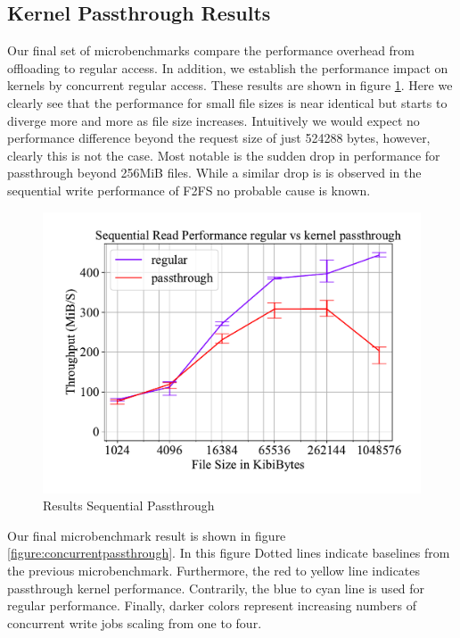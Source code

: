 \subsection{Kernel Passthrough Results}

Our final set of microbenchmarks compare the performance overhead from
offloading to regular access. In addition, we establish the performance impact
on kernels by concurrent regular access. These results are shown in figure
\ref{figure:passthroughresults}. Here we clearly see that the performance
for small file sizes is near identical but starts to diverge more and more
as file size increases. Intuitively we would expect no performance difference
beyond the request size of just 524288 bytes, however, clearly this is not the
case. Most notable is the sudden drop in performance for passthrough beyond
256MiB files. While a similar drop is is observed in the sequential write
performance of F2FS no probable cause is known.

\begin{figure}[h]
    \centering
	\includegraphics[width=1\textwidth]{resources/images/results-passthrough.pdf}
	\caption{Results Sequential Passthrough}
    \label{figure:passthroughresults}
\end{figure}


Our final microbenchmark result is shown in figure
\ref{figure:concurrentpassthrough}. In this figure Dotted lines indicate
baselines from the previous microbenchmark. Furthermore, the red to yellow line
indicates passthrough kernel performance. Contrarily, the blue to cyan line is
used for regular performance. Finally, darker colors represent increasing
numbers of concurrent write jobs scaling from one to four.

